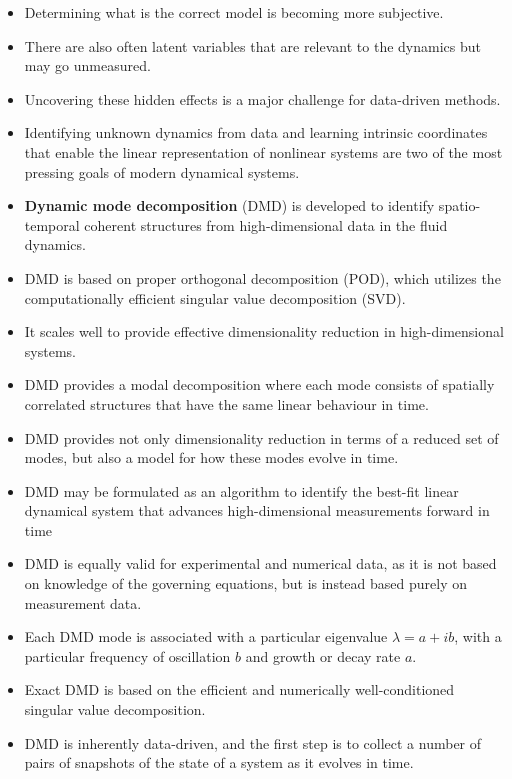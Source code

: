 \documentclass[hyperref={pdfpagemode=FullScreen},aspectratio=169]{beamer}
\begin{document}
\begin{frame}{}
\begin{itemize}
\setlength\itemsep{1em}
\item Determining what is the correct model is becoming more subjective.
\item There are also often latent variables that are relevant to the dynamics but may go unmeasured. \item Uncovering these hidden effects is a major challenge for data-driven methods.
\item Identifying unknown dynamics from data and learning intrinsic coordinates that enable the linear representation of nonlinear systems are two of the most pressing goals of modern dynamical systems.
\item \textbf{Dynamic mode decomposition} (DMD) is developed to identify spatio-temporal coherent structures from high-dimensional data in the fluid dynamics.
\item DMD is based on proper orthogonal decomposition (POD), which utilizes the computationally efficient singular value decomposition (SVD).
\item It scales well to provide effective dimensionality reduction in high-dimensional systems.
\end{itemize}
\end{frame}
\begin{frame}{}
\begin{itemize}
\setlength\itemsep{1em}
\item DMD provides a modal decomposition where each mode consists of spatially correlated structures that have the same linear behaviour in time.
\item DMD provides not only dimensionality reduction in terms of a reduced set of modes, but also a model for how these modes evolve in time.
\item DMD may be formulated as an algorithm to identify the best-fit linear dynamical system that advances high-dimensional measurements forward in time
\item DMD is equally valid for experimental and numerical data, as it is not based on knowledge of the governing equations, but is instead based purely on measurement data.
\item Each DMD mode is associated with a particular eigenvalue $\lambda = a+ib$, with a particular frequency of oscillation $b$ and growth or decay rate $a$.
\item Exact DMD is based on the efficient and numerically well-conditioned singular value decomposition.
\item DMD is inherently data-driven, and the first step is to collect a number of pairs of snapshots of the state of a system as it evolves in time.
\end{itemize}
\end{frame}
\end{document}
